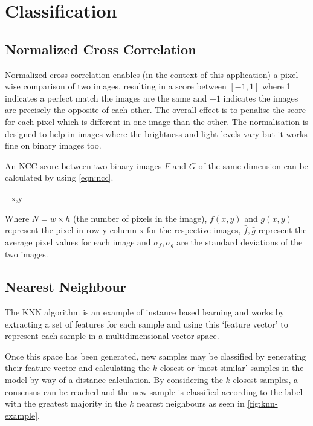 \section{Classification}

\subsection{Normalized Cross Correlation}

Normalized cross correlation enables (in the context of this application) a pixel-wise comparison of two images, resulting in a score between $[-1, 1]$ where 1 indicates a perfect match \eg the images are the same and $-1$ indicates the images are precisely the opposite of each other. The overall effect is to penalise the score for each pixel which is different in one image than the other. The normalisation is designed to help in images where the brightness and light levels vary but it works fine on binary images too.

An NCC score between two binary images $F$ and $G$ of the same dimension can be calculated by using \cref{eqn:ncc}.

\begin{lequation}\label{eqn:ncc}
   \sum_{x,y} 
\end{lequation}

Where $N = w \times h$ (the number of pixels in the image), $f(x,y)$ and $g(x, y)$ represent the pixel in row y column x for the respective images, $\bar{f}, \bar{g}$ represent the average pixel values for each image and $\sigma_{f},  \sigma_{g}$ are the standard deviations of the two images. 

\subsection{Nearest Neighbour}

The \acrfull{KNN} algorithm is an example of instance based learning and works by extracting a set of features for each sample and using this `feature vector' to represent each sample in a multidimensional vector space.

Once this space has been generated, new samples may be classified by generating their feature vector and calculating the $k$ closest or `most similar' samples in the model by way of a distance calculation. By considering the $k$ closest samples, a consensus can be reached and the new sample is classified according to the label with the greatest majority in the $k$ nearest neighbours as seen in \cref{fig:knn-example}.

